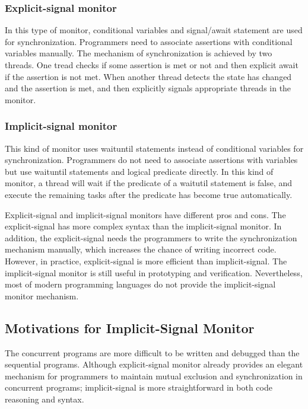 \documentclass[10pt, conference, compsocconf]{IEEEtran}
\begin{document}
  \subsubsection{Explicit-signal monitor} In this type of monitor, conditional
    variables
    and signal/await statement are used for synchronization. Programmers need to
    associate assertions with conditional variables manually. The mechanism of
    synchronization is achieved by two threads. One tread checks if some
    assertion is met or not and then explicit await if the assertion is not
    met. When another thread detects the state has changed and the assertion is
    met, and then explicitly signals appropriate threads in the monitor.
  \subsubsection{Implicit-signal monitor} This kind of monitor uses waituntil
    statements instead of conditional variables for
    synchronization. Programmers do not need to associate assertions with
    variables but use waituntil statements and logical predicate directly. In
    this kind of monitor, a thread will wait if the predicate of a waitutil
    statement is false, and execute the remaining tasks after the predicate
    has become true automatically.

Explicit-signal and implicit-signal monitors have different pros and cons. The 
explicit-signal has more complex syntax than the implicit-signal monitor. In 
addition, the explicit-signal needs the programmers to write the synchronization
mechanism manually, which increases the chance of writing incorrect code. 
However, in practice, explicit-signal is more efficient than implicit-signal. 
The implicit-signal monitor is still useful in prototyping and verification. 
Nevertheless, most of modern programming languages do not provide the 
implicit-signal monitor mechanism.




\subsection{Motivations for Implicit-Signal Monitor}
The concurrent programs are more difficult to be written and debugged than the 
sequential programs. Although explicit-signal monitor already provides an 
elegant mechanism for programmers to maintain mutual exclusion and synchronization 
in concurrent programs; implicit-signal is more straightforward in both code
reasoning and syntax. 
\end{document}
